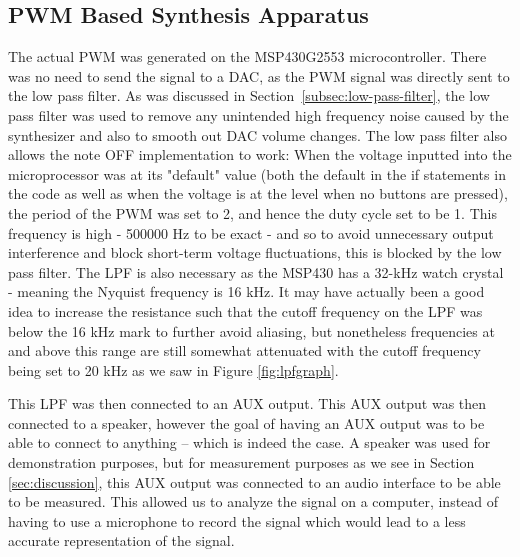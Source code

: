 
\subsection{PWM Based Synthesis Apparatus}\label{subsec:pwm-based-synthesis-apparatus}

The actual PWM was generated on the MSP430G2553 microcontroller.
There was no need to send the signal to a DAC, as the PWM signal was directly sent to the low pass filter. 
As was discussed in Section~\ref{subsec:low-pass-filter}, the low pass filter was used to remove any unintended high frequency noise caused by the synthesizer and also to smooth out DAC volume changes. The low pass filter also allows the note OFF implementation to work: When the voltage inputted into the microprocessor was at its "default" value (both the default in the if statements in the code as well as when the voltage is at the level when no buttons are pressed), the period of the PWM was set to 2, and hence the duty cycle set to be 1. This frequency is high - 500000 Hz to be exact - and so to avoid unnecessary output interference and block short-term voltage fluctuations, this is blocked by the low pass filter. The LPF is also necessary as the MSP430 has a 32-kHz watch crystal - meaning the Nyquist frequency is 16 kHz. It may have actually been a good idea to increase the resistance such that the cutoff frequency on the LPF was below the 16 kHz mark to further avoid aliasing, but nonetheless frequencies at and above this range are still somewhat attenuated with the cutoff frequency being set to 20 kHz as we saw in Figure \ref{fig:lpfgraph}. 

This LPF was then connected to an AUX output. 
This AUX output was then connected to a speaker, however the goal of having an AUX output was to be able to connect to anything -- which is indeed the case. A speaker was used for demonstration purposes, but for measurement purposes as we see in Section \ref{sec:discussion}, this AUX output was connected to an audio interface to be able to be measured. This allowed us to analyze the signal on a computer, instead of having to use a microphone to record the signal which would lead to a less accurate representation of the signal.


